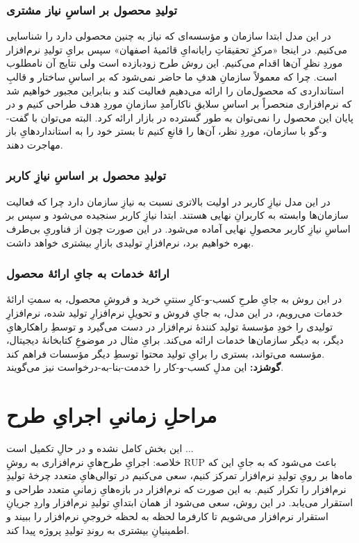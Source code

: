 \documentclass[]{article}
\begin{document}
\subsubsection{تولیدِ محصول بر اساسِ نیاز مشتری}
در این مدل ابتدا سازمان و مؤسسه‌ای که نیاز به چنین محصولی دارد را شناسایی می‌کنیم. در اینجا «مرکزِ تحقیقاتِ رایانه‌ایِ قائمیهٔ اصفهان» سپس برایِ تولیدِ نرم‌افزار موردِ نظرِ آن‌ها اقدام می‌کنیم. این روش طرح زودبازده است ولی نتایج آن نامطلوب است. چرا که معمولاً سازمان‌ِ هدفِ ما حاضر نمی‌شود که بر اساسِ ساختار و قالبِ استانداردی که محصول‌مان را ارائه می‌دهیم فعالیت کند و بنابراین مجبور خواهیم شد که نرم‌افزاری منحصراً بر اساسِ سلایقِ ناکارآمدِ سازمانِ موردِ هدف طراحی کنیم و در پایان این محصول را نمی‌توان به طور گسترده در بازار ارائه کرد. البته می‌توان با گفت-و-گو با سازمان، موردِ نظر، آن‌ها را قانعِ کنیم تا بستر خود را به استانداردهایِ باز مهاجرت دهند.
\subsubsection{تولیدِ محصول بر اساسِ نیازِ کاربر}
در این مدل نیازِ کاربر در اولیت بالاتری نسبت به نیازِ سازمان دارد چرا که فعالیت سازمان‌ها وابسته به کاربرانِ نهایی هستند. ابتدا نیازِ کاربر سنجیده می‌شود و سپس بر اساسِ نیازِ کاربر محصولِ نهایی آماده می‌شود. در این صورت چون از فناوریِ بی‌طرف بهره خواهیم برد، نرم‌افزارِ تولیدی بازارِ بیشتری خواهد داشت.
\subsubsection{ارائهٔ خدمات به جایِ ارائهٔ محصول}
در این روش به جایِ طرحِ کسب-و-کارِ سنتیِ خرید و فروشِ محصول، به سمتِ ارائهٔ خدمات می‌رویم، در این مدل، به جایِ فروش و تحویلِ نرم‌افزارِ تولید شده، نرم‌افزارِ تولیدی را خودِ مؤسسهٔ تولید کنندهٔ نرم‌افزار در دست می‌گیرد و توسطِ راهکارهایِ دیگر، به دیگر سازمان‌ها خدمات ارائه می‌کند. برایِ مثال در موضوعِ کتابخانهٔ دیجیتال، مؤسسه می‌تواند، بستری را برایِ تولید محتوا توسطِ دیگر مؤسسات فراهم کند. \\
\textbf{گوشزد:}
این مدلِ کسب-و-کار را خدمت-بنا-به-درخواست
نیز می‌گویند.
\section{مراحلِ زمانیِ اجرایِ طرح}
این بخش کامل نشده و در حالِ تکمیل است ... \\
خلاصه: اجرایِ طرح‌هایِ نرم‌افزاری به روشِ RUP باعث می‌شود که به جایِ این که ماه‌ها بر رویِ تولیدِ نرم‌افزار تمرکز کنیم، سعی می‌کنیم در توالی‌هایِ متعدد چرخهٔ تولیدِ نرم‌افزار را تکرار کنیم. به این صورت که نرم‌افزار در بازه‌هایِ زمانیِ متعدد طراحی و استقرار می‌یابد. در این روش، سعی می‌شود از همان ابتدایِ تولیدِ نرم‌افزار واردِ جریانِ استقرار نرم‌افزار می‌شویم تا کارفرما لحظه به لحظه خروجیِ نرم‌افزار را ببیند و اطمینیانِ بیشتری به روندِ تولیدِ پروژه پیدا کند.
\end{document}
